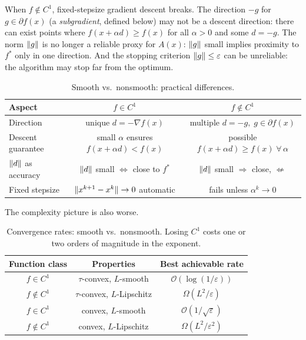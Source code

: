 When $f \notin C^1$, fixed-stepsize gradient descent breaks.
The direction $-g$ for $g \in \partial f(x)$ (a \emph{subgradient}, defined below) may not be a descent direction: there can exist points where $f(x + \alpha d) \geq f(x)$ for all $\alpha > 0$ and some $d = -g$.
The norm $\lVert g\rVert$ is no longer a reliable proxy for $A(x)$: $\lVert g\rVert$ small implies proximity to $f^*$ only in one direction.
And the stopping criterion $\lVert g\rVert \leq \varepsilon$ can be unreliable: the algorithm may stop far from the optimum.

\begin{table}[ht]
	\centering
	\begin{tabular}{@{}lcc@{}}
		\toprule
		Aspect & $f \in C^1$ & $f \notin C^1$ \\
		\midrule
		Direction & unique $d = -\nabla f(x)$ & multiple $d = -g,\; g \in \partial f(x)$ \\
		Descent guarantee & small $\alpha$ ensures $f(x + \alpha d) < f(x)$ & possible $f(x + \alpha d) \geq f(x)\;\forall\,\alpha$ \\
		$\lVert d\rVert$ as accuracy & $\lVert d\rVert$ small $\Leftrightarrow$ close to $f^*$ & $\lVert d\rVert$ small $\Rightarrow$ close, $\not\Leftarrow$ \\
		Fixed stepsize & $\lVert x^{k+1} - x^k\rVert \to 0$ automatic & fails unless $\alpha^k \to 0$ \\
		\bottomrule
	\end{tabular}
	\caption{Smooth vs.\ nonsmooth: practical differences.}
	\label{tab:smooth-nonsmooth-practical}
\end{table}

The complexity picture is also worse.

\begin{table}[ht]
	\centering
	\begin{tabular}{@{}ccc@{}}
		\toprule
		Function class & Properties & Best achievable rate \\
		\midrule
		$f \in C^1$ & $\tau$-convex, $L$-smooth & $\mathcal{O}(\log(1/\varepsilon))$ \\
		$f \notin C^1$ & $\tau$-convex, $L$-Lipschitz & $\Omega(L^2/\varepsilon)$ \\
		$f \in C^1$ & convex, $L$-smooth & $\mathcal{O}(1/\sqrt{\varepsilon})$ \\
		$f \notin C^1$ & convex, $L$-Lipschitz & $\Omega(L^2/\varepsilon^2)$ \\
		\bottomrule
	\end{tabular}
	\caption{Convergence rates: smooth vs.\ nonsmooth.
		Losing $C^1$ costs one or two orders of magnitude in the exponent.}
	\label{tab:smooth-vs-nonsmooth}
\end{table}


